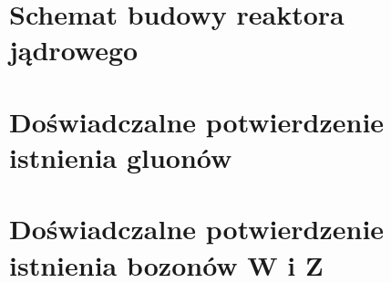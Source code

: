 \documentclass{article}
\begin{document}
\newpage
\section{Schemat budowy reaktora jądrowego}



\newpage
\section{Doświadczalne potwierdzenie istnienia gluonów}



\newpage
\section{Doświadczalne potwierdzenie istnienia bozonów W i Z}
\end{document}
